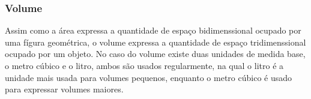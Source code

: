 \begin{multicols*}{2}
    \begin{table}[H]
    \end{table}

    \subsubsection*{Volume}
    Assim como a área expressa a quantidade de espaço bidimenssional ocupado por uma fígura geométrica, o volume expressa
    a quantidade de espaço tridimenssional ocupado por um objeto. No caso do volume existe duas unidades de medida base,
    o metro cúbico e o litro, ambos são usados regularmente, na qual o litro é a unidade mais usada para volumes
    pequenos, enquanto o metro cúbico é usado para expressar volumes maiores.


\end{multicols*}
